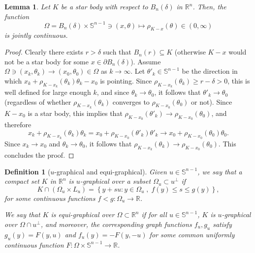 \documentclass[11pt]{article}
\newtheorem{lem}[thm]{Lemma}
\newtheorem{defn}[thm]{Definition}
\theoremstyle{definition}
\theoremstyle{proof}
\DeclareMathOperator{\+}{\mathop{\tilde{+}}}
\newcommand{\set}[1]{\left\{#1\right\}}
\newcommand{\R}{\mathbb{R}}
\renewcommand{\S}{\mathbb{S}}
\numberwithin{equation}{section}
\numberwithin{equation}{section}
\begin{document}
\begin{lem} \label{lem:jointly-cont}
Let $K$ be a star body with respect to $B_n(\delta)$ in $\R^n$. Then, the function
\[
\Omega = B_n(\delta) \times \S^{n-1} \ni (x,\theta) \mapsto \rho_{K - x}(\theta) \in (0,\infty) 
\]
is jointly continuous.  \end{lem}
\begin{proof}
Clearly there exists $r > \delta$ such that $B_n(r) \subseteq K$ (otherwise $K-x$ would not be a star body for some $x \in \partial B_n(\delta)$). 
Assume $\Omega \ni (x_k,\theta_k) \rightarrow (x_0,\theta_0) \in \Omega$ as $k\rightarrow \infty$. Let $\theta'_k \in \S^{n-1}$ be the direction in which $x_k + \rho_{K - x_k}(\theta_k) \theta_k - x_0$ is pointing. Since $\rho_{K-x_k}(\theta_k) \geq r-\delta > 0$, this is well defined for large enough $k$, and since $\theta_k \rightarrow \theta_0$, it follows that $\theta'_k \rightarrow \theta_0$ (regardless of whether $\rho_{K - x_k}(\theta_k)$ converges to $\rho_{K-x_0}(\theta_0)$ or not). Since $K-x_0$ is a star body, this implies that $\rho_{K-x_0}(\theta'_k) \rightarrow \rho_{K-x_0}(\theta_0)$, and therefore
\[
 x_k + \rho_{K-x_k}(\theta_k) \theta_k = x_0 + \rho_{K-x_0}(\theta'_k)  \theta'_k \rightarrow x_0 + \rho_{K-x_0}(\theta_0) \theta_0 . 
 \]
 Since $x_k \rightarrow x_0$ and $\theta_k \rightarrow \theta_0$, it follows that $\rho_{K-x_k}(\theta_k) \rightarrow \rho_{K-x_0}(\theta_0)$. This concludes the proof. 
\end{proof}


\begin{defn}[$u$-graphical and equi-graphical]
Given $u \in \S^{n-1}$, we say that a compact set $K$ in $\R^n$ is $u$-graphical over a subset $\Omega_u \subset u^{\perp}$ if
\begin{equation} \label{eq:u-graphical}
K \cap (\Omega_u \times L_u) = \set{ y+ s u : y \in \Omega_u \; ,\; f(y) \leq s \leq g(y) } ,
\end{equation}
for some continuous functions $f < g : \Omega_u\rightarrow \R$. 

\medskip



We say that $K$ is equi-graphical over $\Omega \subset \R^n$ if for all $u \in \S^{n-1}$, $K$ is $u$-graphical over $\Omega \cap u^{\perp}$, and moreover, the corresponding graph functions $f_u,g_u$ satisfy $g_u(y) = F(y,u)$ and $f_u(y) = -F(y,-u)$ for some common uniformly continuous function $F : \Omega \times \S^{n-1} \rightarrow \R$. 
\end{defn}
\end{document}

